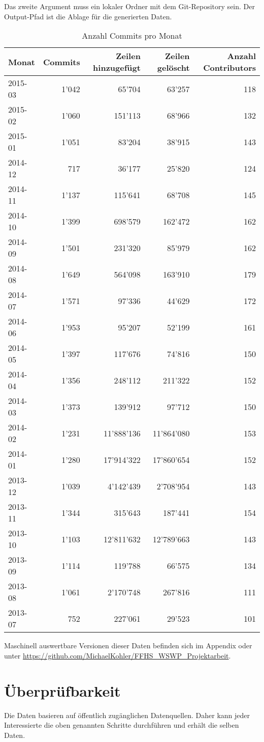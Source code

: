 \noindent
Das zweite Argument muss ein lokaler Ordner mit dem Git-Repository sein. Der Output-Pfad ist die Ablage für die generierten Daten.

\begin{table}%
\begin{tabularx}{\columnwidth}{l|r|r|r|r}
Monat & Commits & Zeilen hinzugefügt & Zeilen gelöscht & Anzahl Contributors\\
\hline
2015-03 & 1'042 & 65'704 & 63'257 & 118\\
\hline
2015-02 & 1'060 & 151'113 & 68'966 & 132\\
\hline
2015-01 & 1'051 & 83'204 & 38'915 & 143\\
\hline
2014-12 & 717 & 36'177 & 25'820 & 124\\
\hline
2014-11 & 1'137 & 115'641 & 68'708 & 145\\
\hline
2014-10 & 1'399 & 698'579 & 162'472 & 162\\
\hline
2014-09 & 1'501 & 231'320 & 85'979 & 162\\
\hline
2014-08 & 1'649 & 564'098 & 163'910 & 179\\
\hline
2014-07 & 1'571 & 97'336 & 44'629 & 172\\
\hline
2014-06 & 1'953 & 95'207 & 52'199 & 161\\
\hline
2014-05 & 1'397 & 117'676 & 74'816 & 150\\
\hline
2014-04 & 1'356 & 248'112 & 211'322 & 152\\
\hline
2014-03 & 1'373 & 139'912 & 97'712 & 150\\
\hline
2014-02 & 1'231 & 11'888'136 & 11'864'080 & 153\\
\hline
2014-01 & 1'280 & 17'914'322 & 17'860'654 & 152\\
\hline
2013-12 & 1'039 & 4'142'439 & 2'708'954 & 143\\
\hline
2013-11 & 1'344 & 315'643 & 187'441 & 154\\
\hline
2013-10 & 1'103 & 12'811'632 & 12'789'663 & 143\\
\hline
2013-09 & 1'114 & 119'788 & 66'575 & 134\\
\hline
2013-08 & 1'061 & 2'170'748 & 267'816 & 111\\
\hline
2013-07 & 752 & 227'061 & 29'523 & 101\\
\end{tabularx}
\caption{Anzahl Commits pro Monat}
\end{table}%

Maschinell auswertbare Versionen dieser Daten befinden sich im Appendix oder unter \url{https://github.com/MichaelKohler/FFHS_WSWP_Projektarbeit}.

\section{Überprüfbarkeit}
Die Daten basieren auf öffentlich zugänglichen Datenquellen. Daher kann jeder Interessierte die oben genannten Schritte durchführen und erhält die selben Daten.